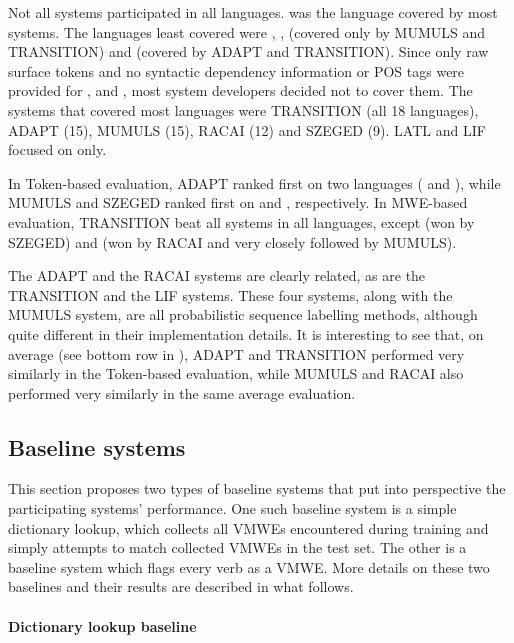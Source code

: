 \documentclass[output=paper,modfonts,nonflat,draftmode]{langsci/langscibook}
\begin{document}
Not all systems participated in all languages.  was the language covered by most systems. The languages least covered were , ,  (covered only by MUMULS and TRANSITION) and  (covered by ADAPT and TRANSITION). Since only raw surface tokens and no syntactic dependency information or POS tags were provided for ,  and , most system developers decided not to cover them. The systems that covered most languages were TRANSITION (all 18 languages), ADAPT (15), MUMULS (15), RACAI (12) and SZEGED (9). LATL and LIF focused on  only. 

In Token-based evaluation, ADAPT ranked first on two languages ( and ), while MUMULS and SZEGED ranked first on  and , respectively. In MWE-based evaluation, TRANSITION beat all systems in all languages, except  (won by SZEGED) and  (won by RACAI and very closely followed by MUMULS).

The ADAPT and the RACAI systems are clearly related, as are the TRANSITION and the LIF systems. These four systems, along with the MUMULS system, are all probabilistic sequence labelling methods, although quite different in their implementation details. It is interesting to see that, on average (see bottom row in ), ADAPT and TRANSITION performed very similarly in the Token-based evaluation, while MUMULS and RACAI also performed very similarly in the same average evaluation. 



\subsection{\label{sec:baselines}Baseline systems}

This section proposes two types of baseline systems that put into perspective the participating systems' performance. One such baseline system is a simple dictionary lookup, which collects all VMWEs encountered during training and simply attempts to match collected VMWEs in the test set. The other is a baseline system which flags every verb as a VMWE. More details on these two baselines and their results are described in what follows. 

\paragraph*{Dictionary lookup baseline}
\end{document}
